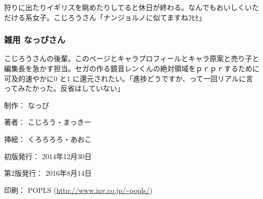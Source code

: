 \documentclass[8pt,b5paper,tombo,openany]{jsbook}
\begin{document}
\begin{flushleft}
\begin{minipage}{0.5\hsize}
\begin{scriptsize}
狩りに出たりイギリスを眺めたりしてると休日が終わる。なんでもおいしくいただける系女子。こじろうさん「ナンジョルノに似てますねﾌﾋﾋ」

\subsubsection*{雑用 なっぴさん}

こじろうさんの後輩。このページとキャラプロフィールとキャラ原案と売り子と編集長を急かす担当。セガの作る鏡音レンくんの絶対領域をｐｒｐｒするために可及的速やかに0 と1 に還元されたい。「進捗どうですか、って一回リアルに言ってみたかった。反省はしていない」

\end{scriptsize}
\end{minipage}
\end{flushleft}

\begin{flushright}
\begin{minipage}{0.5\hsize}
\begin{small}
\begin{description}
  \item{制作：} なっぴ
  \item{著者：} こじろう・まっきー
  \item{挿絵：} くろろろろ・あおこ
  \item{初版発行：} 2014年12月30日
  \item{第2版発行：} 2016年8月14日
  \item{印刷：} POPLS (\url{http://www.inv.co.jp/~popls/})
\end{description}
\end{small}
\end{minipage}
\end{flushright}

\newpage
\end{document}
